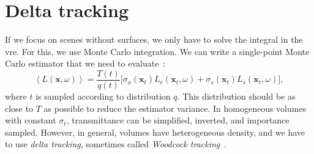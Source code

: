 \section{Delta tracking}

If we focus on scenes without surfaces, we only have to solve the integral in
the \ac{vre}. For this, we use Monte Carlo integration. We can write a
single-point Monte Carlo estimator that we need to
evaluate~\cite{novak_monte_2018}:
\begin{equation}
    \left\langle L(\mathbf{x}, \omega) \right\rangle =
        \frac{T(t)}{q(t)} 
        \bigg[
            \sigma_a(\mathbf{x}_t) L_e(\mathbf{x}_t, \omega)  
            + \sigma_s(\mathbf{x}_t) L_s(\mathbf{x}_t, \omega)
        \bigg],
\end{equation}
where $t$ is sampled according to distribution $q$. This distribution should
be as close to $T$ as possible to reduce the estimator variance. In
homogeneous volumes with constant $\sigma_t$, transmittance can be simplified,
inverted, and importance sampled. However, in general, volumes have 
heterogeneous density, and we have to use \emph{delta tracking}, sometimes
called \emph{Woodcock tracking}~\cite{woodcock_techniques_1965}.

